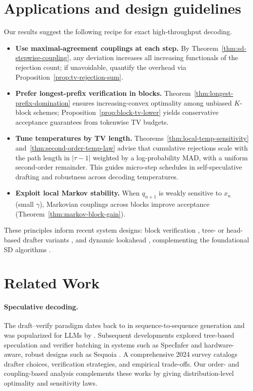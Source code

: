 \documentclass[twoside]{article}
\theoremstyle{plain}
\theoremstyle{definition}
\theoremstyle{remark}
\begin{document}
\section{Applications and design guidelines}
\label{sec:applications}
Our results suggest the following recipe for exact high-throughput decoding.
\begin{itemize}
  \item \textbf{Use maximal-agreement couplings at each step.} By Theorem~\ref{thm:sd-stepwise-coupling}, any deviation increases all increasing functionals of the rejection count; if unavoidable, quantify the overhead via Proposition~\ref{prop:tv-rejection-sum}.
  \item \textbf{Prefer longest-prefix verification in blocks.} Theorem~\ref{thm:longest-prefix-domination} ensures increasing-convex optimality among unbiased $K$-block schemes; Proposition~\ref{prop:block-tv-lower} yields conservative acceptance guarantees from tokenwise TV budgets.
  \item \textbf{Tune temperatures by TV length.} Theorems~\ref{thm:local-temp-sensitivity} and~\ref{thm:second-order-temp-law} advise that cumulative rejections scale with the path length in $|\tau-1|$ weighted by a log-probability MAD, with a uniform second-order remainder. This guides micro-step schedules in self-speculative drafting and robustness across decoding temperatures.
  \item \textbf{Exploit local Markov stability.} When $q_{n+1}$ is weakly sensitive to $x_n$ (small $\gamma$), Markovian couplings across blocks improve acceptance (Theorem~\ref{thm:markov-block-gain}).
\end{itemize}
These principles inform recent system designs: block verification \cite{Sun2024BlockVerification}, tree- or head-based drafter variants \cite{Miao2023SpecInfer,Ankner2024Hydra}, and dynamic lookahead \cite{Mamou2024DISCO}, complementing the foundational SD algorithms \cite{Leviathan2023SpeculativeDecoding,Xia2022SpeculativeDecoding}.

\section{Related Work}
\label{sec:related}
\paragraph{Speculative decoding.} The draft--verify paradigm dates back to \cite{Xia2022SpeculativeDecoding} in sequence-to-sequence generation and was popularized for LLMs by \cite{Leviathan2023SpeculativeDecoding}. Subsequent developments explored tree-based speculation and verifier batching in systems such as SpecInfer \cite{Miao2023SpecInfer} and hardware-aware, robust designs such as Sequoia \cite{Chen2024Sequoia}. A comprehensive 2024 survey \cite{Xia2024Survey} catalogs drafter choices, verification strategies, and empirical trade-offs. Our order- and coupling-based analysis complements these works by giving distribution-level optimality and sensitivity laws.
\end{document}

